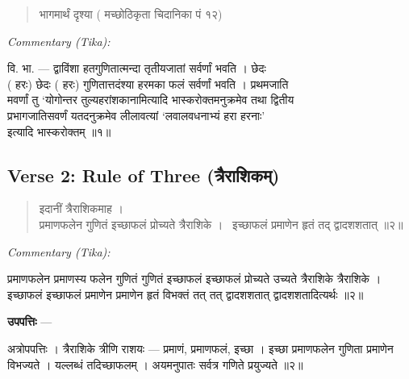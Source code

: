\documentclass[11pt,a4paper]{article}
\newcommand{\dev}[1]{{\devanagarifont #1}}
\newcommand{\skt}[1]{{\devanagarifont\color{sktcolor} #1}}
\newenvironment{shloka}{%
  \begin{quote}%
  \smallskip%
  \devanagarifont\color{sktcolor}%
}{%
  \smallskip%
  \end{quote}%
}
\newenvironment{tika}{%
  \smallskip%
  \noindent\textit{Commentary (Tika):}\par%
  \smallskip%
  \hindifont\small%
}{%
  \par\smallskip%
}
\newenvironment{upapatti}{%
  \smallskip%
  \noindent\textbf{\devanagarifont उपपत्तिः} — \devanagarifont\small%
}{%
  \par\smallskip%
}
\begin{document}
\vspace{0.5cm}

\begin{shloka}
\skt{भागमार्थं दृश्या} (\skt{मच्छोठिकृता चिदानिका पं १२})
\end{shloka}

\vspace{0.3cm}
\begin{tika}
\skt{वि. भा. — द्वाविंशा हतगुणितात्मन्दा तृतीयजातां सर्वर्णां भवति । छेदः}\\
(\skt{हरः}) \skt{छेदः} (\skt{हरः}) \skt{गुणितात्तदंश्या हरमका फलं सर्वर्णां भवति । प्रथमजाति}\\
\skt{मवर्णां तु `योगोन्तर तुल्यहरांशकानामित्यादि भास्करोक्तमनुक्रमेव तथा द्वितीय}\\
\skt{प्रभागजातिसवर्णं यतदनुक्रमेव लीलावत्यां `लवालवधनाभ्यं हरा हरनाः'}\\
\skt{इत्यादि भास्करोक्तम्} ॥१॥
\end{tika}

\subsection*{Verse 2: Rule of Three (\dev{त्रैराशिकम्})}

\begin{shloka}
\skt{इदानीं त्रैराशिकमाह ।}\\[0.5em]
\skt{प्रमाणफलेन गुणितं इच्छाफलं प्रोच्यते त्रैराशिके ।}\
\skt{इच्छाफलं प्रमाणेन हृतं तद् द्वादशशतात्} ॥२॥
\end{shloka}

\vspace{0.3cm}
\begin{tika}
\skt{प्रमाणफलेन} प्रमाणस्य फलेन \skt{गुणितं} गुणितं \skt{इच्छाफलं} इच्छाफलं \skt{प्रोच्यते} उच्यते \skt{त्रैराशिके} त्रैराशिके । \skt{इच्छाफलं} इच्छाफलं \skt{प्रमाणेन} प्रमाणेन \skt{हृतं} विभक्तं \skt{तत्} तत् \skt{द्वादशशतात्} द्वादशशतादित्यर्थः ॥२॥
\end{tika}

\vspace{0.3cm}
\begin{upapatti}
\skt{अत्रोपपत्तिः} । त्रैराशिके त्रीणि राशयः — प्रमाणं, प्रमाणफलं, इच्छा । इच्छा प्रमाणफलेन गुणिता प्रमाणेन विभज्यते । यल्लब्धं तदिच्छाफलम् । अयमनुपातः सर्वत्र गणिते प्रयुज्यते ॥२॥
\end{upapatti}
\end{document}
